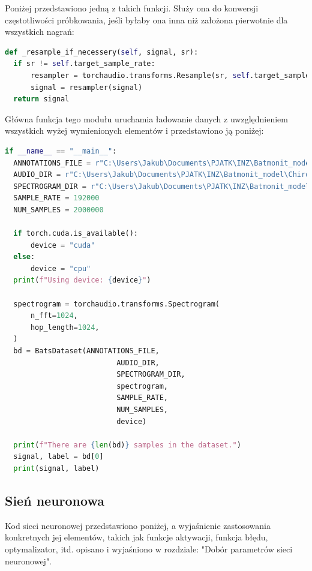 \documentclass{sprz}
\begin{document}
Poniżej przedstawiono jedną z takich funkcji. Służy ona do konwersji częstotliwości próbkowania, jeśli byłaby ona inna niż założona pierwotnie dla wszystkich nagrań:

\begin{lstlisting}[language=Python,caption={Implementacja konwersji dźwięku na spektrogram}, label={lst:audio-to-spectrogram}]
  def _resample_if_necessery(self, signal, sr):
  if sr != self.target_sample_rate:
      resampler = torchaudio.transforms.Resample(sr, self.target_sample_rate)
      signal = resampler(signal)
  return signal
\end{lstlisting}

Główna funkcja tego modułu uruchamia ładowanie danych z uwzględnieniem wszystkich wyżej wymienionych elementów i przedstawiono ją poniżej:

\begin{lstlisting}[language=Python,caption={Implementacja modułu do ładowania danych}, label={lst:audio-to-spectrogram}]
  if __name__ == "__main__":
  ANNOTATIONS_FILE = r"C:\Users\Jakub\Documents\PJATK\INZ\Batmonit_model\Chiro_sounds_signed\Metadata\Annotations.csv"
  AUDIO_DIR = r"C:\Users\Jakub\Documents\PJATK\INZ\Batmonit_model\Chiro_sounds_signed\Audio"
  SPECTROGRAM_DIR = r"C:\Users\Jakub\Documents\PJATK\INZ\Batmonit_model\Chiro_sounds_signed\Spectrogram"
  SAMPLE_RATE = 192000
  NUM_SAMPLES = 2000000

  if torch.cuda.is_available():
      device = "cuda"
  else:
      device = "cpu"
  print(f"Using device: {device}")

  spectrogram = torchaudio.transforms.Spectrogram(
      n_fft=1024,
      hop_length=1024,
  )
  bd = BatsDataset(ANNOTATIONS_FILE,
                          AUDIO_DIR,
                          SPECTROGRAM_DIR, 
                          spectrogram, 
                          SAMPLE_RATE,
                          NUM_SAMPLES,
                          device)

  print(f"There are {len(bd)} samples in the dataset.")
  signal, label = bd[0]
  print(signal, label)
\end{lstlisting}

\subsection{Sień neuronowa}
Kod sieci neuronowej przedstawiono poniżej, a wyjaśnienie zastosowania konkretnych jej elementów, takich jak funkcje aktywacji, funkcja błędu, optymalizator, itd. opisano i wyjaśniono w rozdziale: "Dobór parametrów sieci neuronowej".
\end{document}
